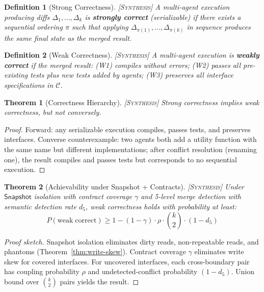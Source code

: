 \documentclass[11pt, a4paper, logo, copyright]{googledeepmind}
\newtheorem{definition}{Definition}[section]
\newtheorem{theorem}{Theorem}[section]
\newcommand{\synthesis}{\textsc{[Synthesis]}}
\begin{document}
\begin{definition}[Strong Correctness] \synthesis{}
A multi-agent execution producing diffs $\Delta_1, \ldots, \Delta_k$ is \textbf{strongly correct} (serializable) if there exists a sequential ordering $\pi$ such that applying $\Delta_{\pi(1)}, \ldots, \Delta_{\pi(k)}$ in sequence produces the same final state as the merged result.
\end{definition}

\begin{definition}[Weak Correctness] \synthesis{}
A multi-agent execution is \textbf{weakly correct} if the merged result: (W1) compiles without errors; (W2) passes all pre-existing tests plus new tests added by agents; (W3) preserves all interface specifications in $\mathcal{C}$.
\end{definition}

\begin{theorem}[Correctness Hierarchy] \synthesis{}
\label{thm:correctness}
Strong correctness implies weak correctness, but not conversely.
\end{theorem}

\begin{proof}
Forward: any serializable execution compiles, passes tests, and preserves interfaces.
Converse counterexample: two agents both add a utility function with the same name but different implementations; after conflict resolution (renaming one), the result compiles and passes tests but corresponds to no sequential execution.
\end{proof}

\begin{theorem}[Achievability under Snapshot + Contracts] \synthesis{}
\label{thm:achievability}
Under $\mathsf{Snapshot}$ isolation with contract coverage $\gamma$ and 5-level merge detection with semantic detection rate $d_5$, weak correctness holds with probability at least:
\begin{equation}
  P(\mathrm{weak\;correct}) \geq 1 - (1-\gamma) \cdot \rho \cdot \binom{k}{2} \cdot (1 - d_5)
\end{equation}
\end{theorem}

\begin{proof}[Proof sketch]
Snapshot isolation eliminates dirty reads, non-repeatable reads, and phantoms (Theorem~\ref{thm:write-skew}).
Contract coverage $\gamma$ eliminates write skew for covered interfaces.
For uncovered interfaces, each cross-boundary pair has coupling probability $\rho$ and undetected-conflict probability $(1 - d_5)$.
Union bound over $\binom{k}{2}$ pairs yields the result.
\end{proof}
\end{document}

